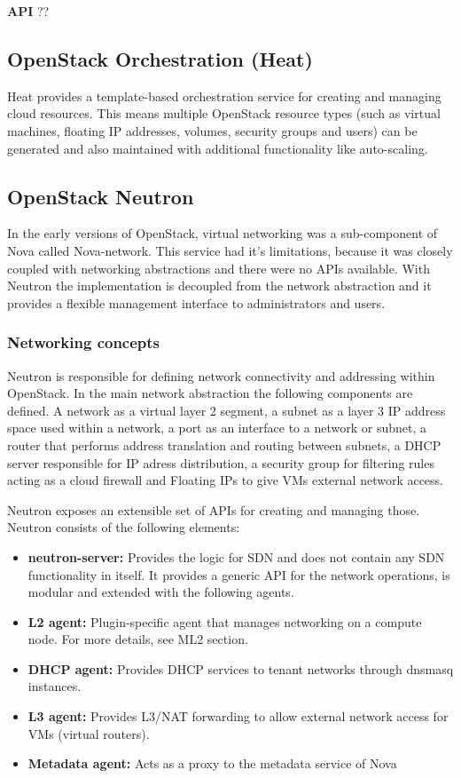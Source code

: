 \textbf{API}
??


\subsection{OpenStack Orchestration (Heat)}

Heat provides a template-based orchestration service for creating and managing cloud resources. This means multiple OpenStack resource types (such as virtual machines, floating IP addresses, volumes, security groups and users) can be generated and also maintained with additional functionality like auto-scaling.


\subsection{OpenStack Neutron}

In the early versions of OpenStack, virtual networking was a sub-component of Nova called Nova-network. This service had it's limitations, because it was closely coupled with networking abstractions and there were no APIs available. With Neutron the implementation is decoupled from the network abstraction and it provides a flexible management interface to administrators and users.


\subsubsection{Networking concepts}

Neutron is responsible for defining network connectivity and addressing within OpenStack. In the main network abstraction the following components are defined. A network as a virtual layer 2 segment, a subnet as a layer 3 IP address space used within a network, a port as an interface to a network or subnet, a router that performs address translation and routing between subnets, a DHCP server responsible for IP adress distribution, a security group for filtering rules acting as a cloud firewall and Floating IPs to give VMs external network access.

Neutron exposes an extensible set of APIs for creating and managing those. Neutron consists of the following elements:
\begin{itemize}
\item \textbf{neutron-server:} Provides the logic for SDN and does not contain any SDN functionality in itself. It provides a generic API for the network operations, is modular and extended with the following agents.
\item \textbf{L2 agent:} Plugin-specific agent that manages networking on a compute node. For more details, see ML2 section.
\item \textbf{DHCP agent:} Provides DHCP services to tenant networks through dnsmasq instances.
\item \textbf{L3 agent:} Provides L3/NAT forwarding to allow external network access for VMs (virtual routers).
\item \textbf{Metadata agent:} Acts as a proxy to the metadata service of Nova
\end{itemize}

